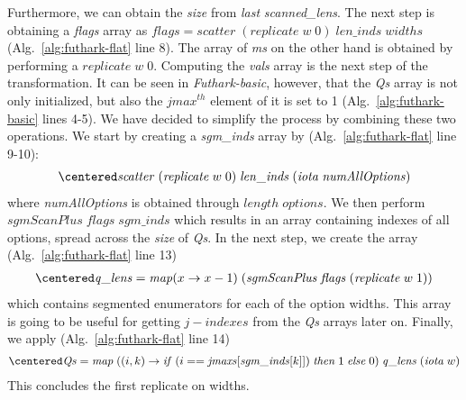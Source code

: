 Furthermore, we can obtain the \textit{size} from \textit{last} \textit{scanned\_lens}. The next step is obtaining a \textit{flags} array as
$\mathit{flags} = \mathit{scatter}\;(\mathit{replicate}\;w\;0)\;\mathit{len\_inds}\;\mathit{widths}$ (Alg.~\ref{alg:futhark-flat} line 8).
The array of \textit{ms} on the other hand is obtained by performing a $\mathit{replicate}\;w\;0$. Computing the \textit{vals} array is the next step of the transformation. It can be seen in \textit{Futhark-basic}, however, that the \textit{Qs} array is not only initialized, but also the $\mathit{jmax}^{\mathit{th}}$ element of it is set to 1 (Alg.~\ref{alg:futhark-basic} lines 4-5). We have decided to simplify the process by combining these two operations. We start by creating a \textit{sgm\_inds} array by (Alg.~\ref{alg:futhark-flat} line 9-10):
\begin{align}
\centered
\nonumber
\mathit{scatter}\;(\mathit{replicate}\;w\;0)\;\mathit{len\_inds}\;(\mathit{iota}\;\mathit{numAllOptions})
\end{align}
 where \textit{numAllOptions} is obtained through $\mathit{length}\;\mathit{options}$. We then perform
 \\$\mathit{sgmScanPlus}\;\mathit{flags}\;\mathit{sgm\_inds}$ which results in an array containing indexes of all options, spread across the \textit{size} of \textit{Qs}. In the next step, we create the array (Alg.~\ref{alg:futhark-flat} line 13)
\begin{align}
\centered
\nonumber
\mathit{q\_lens} = \mathit{map}(x\rightarrow x-1)\;(\mathit{sgmScanPlus}\;\mathit{flags}\;(\mathit{replicate}\;w\;1))
\end{align}
which contains segmented enumerators for each of the option widths. This array is going to be useful for getting $j-indexes$ from the \textit{Qs} arrays later on. Finally, we apply (Alg.~\ref{alg:futhark-flat} line 14)
\begin{align}
\centered
\nonumber
\mathit{Qs}=\mathit{map}\;((i,k) \rightarrow \mathit{if}\;(i==\mathit{jmaxs}[\mathit{sgm\_inds}[k]])\;\mathit{then}\;1\;\mathit{else}\;0)\;\mathit{q\_lens}\;(\mathit{iota}\;w)
\end{align}
This concludes the first replicate on widths.
\\\\
